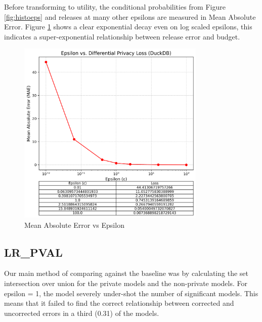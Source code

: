 \documentclass[12pt,letterpaper]{article}
\begin{document}
Before transforming to utility, the conditional probabilities from Figure \ref{fig:histoeps} and releases at many other epsilons are measured in Mean Absolute Error. Figure \ref{fig:epsilon_vs_loss} shows a clear exponential decay even on log scaled epsilons, this indicates a super-exponential relationship between release error and budget. 

\begin{figure}[H]
    \centering
    \includegraphics[width=0.8\textwidth]{figure/epsilon_vs_loss.png}
    \caption{Mean Absolute Error vs Epsilon}
    \label{fig:epsilon_vs_loss}
\end{figure}

\subsection{LR\_PVAL}
Our main method of comparing against the baseline was by calculating the set intersection over union for the private models and the non-private models. For epsilon = 1, the model severely under-shot the number of significant models. This means that it failed to find the correct relationship between corrected and uncorrected errors in a third (0.31) of the models.
\end{document}
